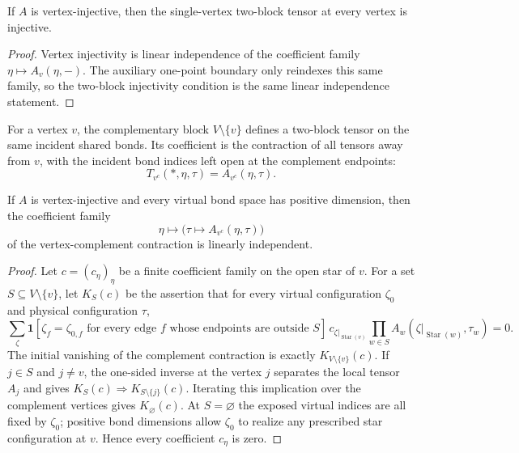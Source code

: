 \begin{theorem}%
    \label{thm:peps_isTwoBlockInjective_vertexTwoBlock}
    \leanok
    If $A$ is vertex-injective, then the single-vertex two-block tensor at every
    vertex is injective.
\end{theorem}
\begin{proof}\leanok
    Vertex injectivity is linear independence of the coefficient family
    $\eta\mapsto A_v(\eta,-)$.  The auxiliary one-point boundary only reindexes
    this same family, so the two-block injectivity condition is the same linear
    independence statement.
\end{proof}

\begin{definition}%
    \label{def:peps_complementTwoBlock}
    \leanok
    For a vertex $v$, the complementary block $V\setminus\{v\}$ defines a
    two-block tensor on the same incident shared bonds. Its coefficient is the
    contraction of all tensors away from $v$, with the incident bond indices
    left open at the complement endpoints:
    \[
        T_{v^c}(*,\eta,\tau)=A_{v^c}(\eta,\tau).
    \]
\end{definition}

\begin{theorem}%
    \label{thm:peps_vertexComplementTensorInjective}
    \leanok
    If $A$ is vertex-injective and every virtual bond space has positive
    dimension, then the coefficient family
    \[
        \eta\longmapsto \bigl(\tau\longmapsto A_{v^c}(\eta,\tau)\bigr)
    \]
    of the vertex-complement contraction is linearly independent.
\end{theorem}
\begin{proof}\leanok
    Let $c=(c_\eta)_\eta$ be a finite coefficient family on the open star of
    $v$. For a set $S\subseteq V\setminus\{v\}$, let $K_S(c)$ be the assertion
    that for every virtual configuration $\zeta_0$ and physical configuration
    $\tau$,
    \[
        \sum_{\zeta}
        \mathbf 1[
                \zeta_f=\zeta_{0,f}\text{ for every edge }f
                \text{ whose endpoints are outside }S]\,
        c_{\zeta|_{\operatorname{Star}(v)}}
        \prod_{w\in S} A_w(\zeta|_{\operatorname{Star}(w)},\tau_w)=0 .
    \]
    The initial vanishing of the complement contraction is exactly
    $K_{V\setminus\{v\}}(c)$. If $j\in S$ and $j\neq v$, the one-sided inverse at
    the vertex $j$ separates the local tensor $A_j$ and gives
    $K_S(c)\Rightarrow K_{S\setminus\{j\}}(c)$. Iterating this implication over
    the complement vertices gives $K_\varnothing(c)$. At $S=\varnothing$ the
    exposed virtual indices are all fixed by $\zeta_0$; positive bond dimensions
    allow $\zeta_0$ to realize any prescribed star configuration at $v$. Hence
    every coefficient $c_\eta$ is zero.
\end{proof}

